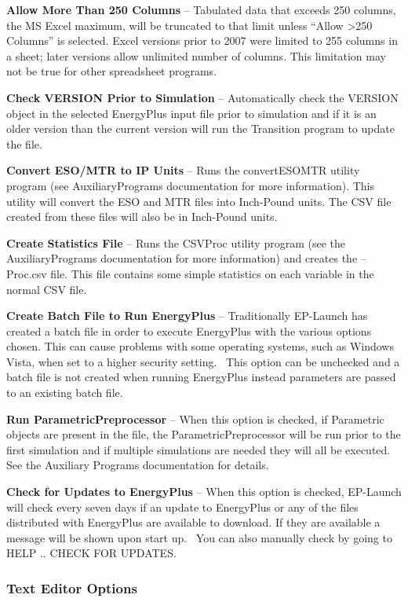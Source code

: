 \textbf{Allow More Than 250 Columns} -- Tabulated data that exceeds 250 columns, the MS Excel maximum, will be truncated to that limit unless ``Allow \textgreater{}250 Columns'' is selected. Excel versions prior to 2007 were limited to 255 columns in a sheet; later versions allow unlimited number of columns. This limitation may not be true for other spreadsheet programs.

\textbf{Check VERSION Prior to Simulation} -- Automatically check the VERSION object in the selected EnergyPlus input file prior to simulation and if it is an older version than the current version will run the Transition program to update the file.

\textbf{Convert ESO/MTR to IP Units} -- Runs the convertESOMTR utility program (see AuxiliaryPrograms documentation for more information). This utility will convert the ESO and MTR files into Inch-Pound units. The CSV file created from these files will also be in Inch-Pound units.

\textbf{Create Statistics File} -- Runs the CSVProc utility program (see the AuxiliaryPrograms documentation for more information) and creates the --Proc.csv file. This file contains some simple statistics on each variable in the normal CSV file.

\textbf{Create Batch File to Run EnergyPlus} -- Traditionally EP-Launch has created a batch file in order to execute EnergyPlus with the various options chosen. This can cause problems with some operating systems, such as Windows Vista, when set to a higher security setting.~ This option can be unchecked and a batch file is not created when running EnergyPlus instead parameters are passed to an existing batch file.

\textbf{Run ParametricPreprocessor} -- When this option is checked, if Parametric objects are present in the file, the ParametricPreprocessor will be run prior to the first simulation and if multiple simulations are needed they will all be executed. See the Auxiliary Programs documentation for details.

\textbf{Check for Updates to EnergyPlus} -- When this option is checked, EP-Launch will check every seven days if an update to EnergyPlus or any of the files distributed with EnergyPlus are available to download. If they are available a message will be shown upon start up.~ You can also manually check by going to HELP .. CHECK FOR UPDATES.

\subsubsection{Text Editor Options}\label{text-editor-options}

